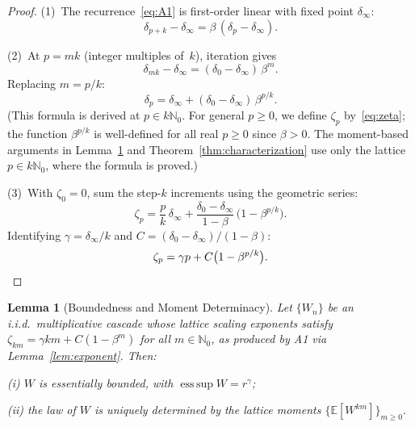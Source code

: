 \documentclass[pdflatex,sn-mathphys-num]{sn-jnl}
\theoremstyle{thmstyleone}
\newtheorem{lemma}[theorem]{Lemma}
\theoremstyle{thmstyletwo}
\theoremstyle{thmstylethree}
\DeclareMathOperator*{\esssup}{ess\,sup}
\begin{document}
\begin{proof}
(1)~The recurrence~\eqref{eq:A1} is first-order linear with fixed
point $\delta_\infty$:
\[
  \delta_{p+k} - \delta_\infty = \beta\,(\delta_p - \delta_\infty).
\]

(2)~At $p = mk$ (integer multiples of~$k$), iteration gives
\[
  \delta_{mk} - \delta_\infty
  = (\delta_0 - \delta_\infty)\,\beta^m.
\]
Replacing $m = p/k$:
\[
  \delta_p
  = \delta_\infty + (\delta_0 - \delta_\infty)\,\beta^{p/k}.
\]
(This formula is derived at $p \in k\mathbb{N}_0$.  For general $p
\geq 0$, we define $\zeta_p$ by~\eqref{eq:zeta}; the function
$\beta^{p/k}$ is well-defined for all real $p \geq 0$ since $\beta >
0$.  The moment-based arguments in Lemma~\ref{lem:determinacy} and
Theorem~\ref{thm:characterization} use only the lattice
$p \in k\mathbb{N}_0$, where the formula is proved.)

(3)~With $\zeta_0 = 0$, sum the step-$k$ increments using the
geometric series:
\[
  \zeta_p
  = \frac{p}{k}\,\delta_\infty
    + \frac{\delta_0 - \delta_\infty}{1 - \beta}\,
      \bigl(1 - \beta^{p/k}\bigr).
\]
Identifying $\gamma = \delta_\infty/k$ and $C = (\delta_0 -
\delta_\infty)/(1-\beta)$:
\[
  \zeta_p = \gamma p + C\bigl(1 - \beta^{p/k}\bigr).  \qedhere
\]
\end{proof}


\begin{lemma}[Boundedness and Moment Determinacy]\label{lem:determinacy}
Let $\{W_n\}$ be an i.i.d.\ multiplicative cascade whose lattice
scaling exponents satisfy
$\zeta_{km} = \gamma km + C(1-\beta^{m})$ for all $m \in
\mathbb{N}_0$, as produced by A1 via Lemma~\ref{lem:exponent}.  Then:

\textup{(i)} $W$ is essentially bounded, with $\esssup W =
r^{\gamma}$;

\textup{(ii)} the law of $W$ is uniquely determined by the lattice
moments $\{\mathbb{E}[W^{km}]\}_{m \ge 0}$.
\end{lemma}
\end{document}
